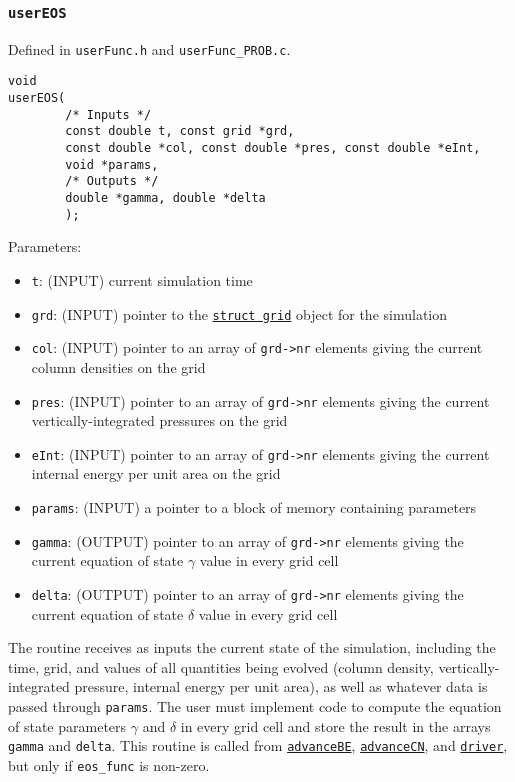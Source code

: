 \documentclass[12pt]{article}
\begin{document}
\subsubsection{\texttt{userEOS}}
\label{sssec:userEOS}

Defined in \verb=userFunc.h= and \verb=userFunc_PROB.c=.

\begin{verbatim}
void
userEOS(
        /* Inputs */
        const double t, const grid *grd, 
        const double *col, const double *pres, const double *eInt,
        void *params,
        /* Outputs */
        double *gamma, double *delta
        );
\end{verbatim}

Parameters:
\begin{itemize}
\item \texttt{t}: (INPUT) current simulation time
\item \texttt{grd}: (INPUT) pointer to the \hyperref[sssec:datastructures]{\texttt{struct grid}} object for the simulation
\item \texttt{col}: (INPUT) pointer to an array of \texttt{grd->nr} elements giving the current column densities on the grid
\item \texttt{pres}: (INPUT) pointer to an array of \texttt{grd->nr} elements giving the current vertically-integrated pressures on the grid
\item \texttt{eInt}: (INPUT) pointer to an array of \texttt{grd->nr} elements giving the current internal energy per unit area on the grid
\item \texttt{params}: (INPUT) a pointer to a block of memory containing parameters
\item \texttt{gamma}: (OUTPUT) pointer to an array of \texttt{grd->nr} elements giving the current equation of state $\gamma$ value in every grid cell
\item \texttt{delta}: (OUTPUT) pointer to an array of \texttt{grd->nr} elements giving the current equation of state $\delta$ value in every grid cell
\end{itemize}

The routine receives as inputs the current state of the simulation, including the time, grid, and values of all quantities being evolved (column density, vertically-integrated pressure, internal energy per unit area), as well as whatever data is passed through \verb=params=. The user must implement code to compute the equation of state parameters $\gamma$ and $\delta$ in every grid cell and store the result in the arrays \verb=gamma= and \verb=delta=. This routine is called from \hyperref[sssec:advanceBE]{\texttt{advanceBE}}, \hyperref[sssec:advanceCN]{\texttt{advanceCN}}, and \hyperref[sssec:driver]{\texttt{driver}}, but only if \verb=eos_func= is non-zero.
\end{document}
